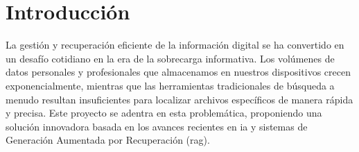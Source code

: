 
\chapter{Introducción}

La gestión y recuperación eficiente de la información digital se ha convertido en un desafío cotidiano en la era de la sobrecarga informativa. Los volúmenes de datos personales y profesionales que almacenamos en nuestros dispositivos crecen exponencialmente, mientras que las herramientas tradicionales de búsqueda a menudo resultan insuficientes para localizar archivos específicos de manera rápida y precisa. Este proyecto se adentra en esta problemática, proponiendo una solución innovadora basada en los avances recientes en \gls{ia} y sistemas de Generación Aumentada por Recuperación (\gls{rag}).

